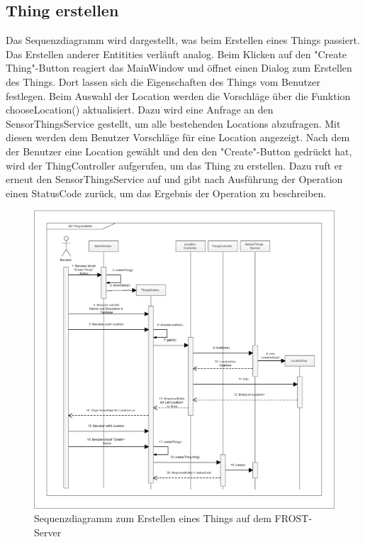 \clearpage
\subsection{Thing erstellen}

Das Sequenzdiagramm wird dargestellt, was beim Erstellen eines Things passiert.
Das Erstellen anderer Entitities verläuft analog.
Beim Klicken auf den "{Create Thing}"{-Button} reagiert das MainWindow und öffnet einen Dialog zum Erstellen des Things.
Dort lassen sich die Eigenschaften des Things vom Benutzer festlegen.
Beim Auswahl der Location werden die Vorschläge über die Funktion chooseLocation() aktualisiert.
Dazu wird eine Anfrage an den SensorThingsService gestellt, um alle bestehenden Locations abzufragen.
Mit diesen werden dem Benutzer Vorschläge für eine Location angezeigt.
Nach dem der Benutzer eine Location gewählt und den den "{Create}"{-Button} gedrückt hat, wird der ThingController aufgerufen, um das Thing zu erstellen.
Dazu ruft er erneut den SensorThingsService auf und gibt nach Ausführung der Operation einen StatusCode zurück, um das Ergebnis der Operation zu beschreiben.

\begin{figure}[htbp]
\centering
\includegraphics[scale=0.44]{uml/SD_createThing.eps}
\caption{Sequenzdiagramm zum Erstellen eines Things auf dem FROST-Server}
\end{figure}